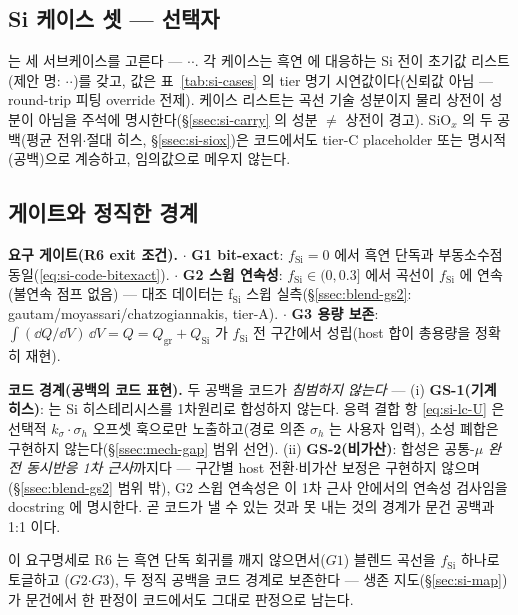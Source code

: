 \subsection{Si 케이스 셋 ---  선택자}\label{ssec:code-caseset}
 는 세 서브케이스를 고른다 --- $\cdot$$\cdot$.
각 케이스는 흑연  에 대응하는 Si 전이 초기값 리스트(제안 명:
$\cdot$$\cdot$)를 갖고, 값은 표~\ref{tab:si-cases}
의 tier 명기 시연값이다(신뢰값 아님 --- round-trip 피팅 override 전제). 케이스 리스트는 곡선 기술
성분이지 물리 상전이 성분이 아님을 주석에 명시한다(\S\ref{ssec:si-carry} 의 성분 $\ne$ 상전이 경고).
SiO$_x$ 의 두 공백(평균 전위$\cdot$절대 히스, \S\ref{ssec:si-siox})은 코드에서도 tier-C placeholder
또는 명시적 (공백)으로 계승하고, 임의값으로 메우지 않는다.

\subsection{게이트와 정직한 경계}\label{ssec:code-gates}
\begin{codebox}
\textbf{요구 게이트(R6 exit 조건).}
$\cdot$ \textbf{G1 bit-exact}: $f_\mathrm{Si}{=}0$ 에서 흑연 단독과 부동소수점 동일(\eqref{eq:si-code-bitexact}).
$\cdot$ \textbf{G2 스윕 연속성}: $f_\mathrm{Si}\in(0,0.3]$ 에서 곡선이 $f_\mathrm{Si}$ 에 연속(불연속 점프 없음)
--- 대조 데이터는 f$_\mathrm{Si}$ 스윕 실측(\S\ref{ssec:blend-gs2}: gautam/moyassari/chatzogiannakis, tier-A).
$\cdot$ \textbf{G3 용량 보존}: $\int(\dd Q/\dd V)\,\dd V=Q=Q_\mathrm{gr}+Q_\mathrm{Si}$ 가 $f_\mathrm{Si}$
전 구간에서 성립(host 합이 총용량을 정확히 재현).
\end{codebox}

\begin{warnbox}
\textbf{코드 경계(공백의 코드 표현).} 두 공백을 코드가 \emph{침범하지 않는다} --- (i) \textbf{GS-1(기계
히스)}:  는 Si 히스테리시스를 1차원리로 합성하지 않는다. 응력 결합 항
\eqref{eq:si-lc-U} 은 선택적 $k_\sigma\!\cdot\!\sigma_h$ 오프셋 훅으로만 노출하고(경로 의존 $\sigma_h$
는 사용자 입력), 소성 폐합은 구현하지 않는다(\S\ref{ssec:mech-gap} 범위 선언). (ii) \textbf{GS-2(비가산)}:
합성은 공통-$\mu$ \emph{완전 동시반응 1차 근사}까지다 --- 구간별 host 전환$\cdot$비가산 보정은 구현하지
않으며(\S\ref{ssec:blend-gs2} 범위 밖), G2 스윕 연속성은 이 1차 근사 안에서의 연속성 검사임을 docstring
에 명시한다. 곧 코드가 낼 수 있는 것과 못 내는 것의 경계가 문건 공백과 1:1 이다.
\end{warnbox}

이 요구명세로 R6 는 흑연 단독 회귀를 깨지 않으면서($G1$) 블렌드 곡선을 $f_\mathrm{Si}$ 하나로 토글하고
($G2$$\cdot$$G3$), 두 정직 공백을 코드 경계로 보존한다 --- 생존 지도(\S\ref{sec:si-map})가 문건에서
한 판정이 코드에서도 그대로 판정으로 남는다.

